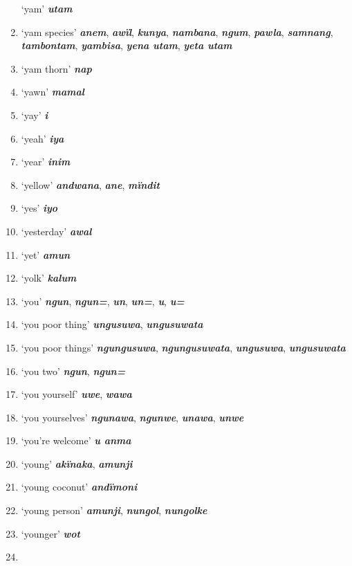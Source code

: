 \begin{enumerate}[noitemsep, label={}, align=left, widest=190, labelsep=1ex,leftmargin=*,itemindent=-10pt]
‘yam’ \textbf{\textit{utam}} \item
‘yam species’ \textbf{\textit{anem}}, \textbf{\textit{awïl}}, \textbf{\textit{kunya}}, \textbf{\textit{nambana}}, \textbf{\textit{ngum}}, \textbf{\textit{pawla}}, \textbf{\textit{samnang}}, \linebreak \textbf{\textit{tambontam}}, \textbf{\textit{yambisa}}, \textbf{\textit{yena utam}}, \textbf{\textit{yeta utam}} \item
‘yam thorn’ \textbf{\textit{nap}} \item
‘yawn’ \textbf{\textit{mamal}} \item
‘yay’ \textbf{\textit{i}} \item
‘yeah’ \textbf{\textit{iya}} \item
‘year’ \textbf{\textit{inim}} \item
‘yellow’ \textbf{\textit{andwana}}, \textbf{\textit{ane}}, \textbf{\textit{mïndit}} \item
‘yes’ \textbf{\textit{iyo}} \item
‘yesterday’ \textbf{\textit{awal}} \item
‘yet’ \textbf{\textit{amun}} \item
‘yolk’ \textbf{\textit{kalum}} \item
‘you’ \textbf{\textit{ngun}}, \textbf{\textit{ngun=}}, \textbf{\textit{un}}, \textbf{\textit{un=}}, \textbf{\textit{u}}, \textbf{\textit{u=}} \item
‘you poor thing’ \textbf{\textit{ungusuwa}}, \textbf{\textit{ungusuwata}} \item
‘you poor things’ \textbf{\textit{ngungusuwa}}, \textbf{\textit{ngungusuwata}}, \textbf{\textit{ungusuwa}}, \textbf{\textit{ungusuwata}} \item
‘you two’ \textbf{\textit{ngun}}, \textbf{\textit{ngun=}} \item
‘you yourself’ \textbf{\textit{uwe}}, \textbf{\textit{wawa}} \item
‘you yourselves’ \textbf{\textit{ngunawa}}, \textbf{\textit{ngunwe}}, \textbf{\textit{unawa}}, \textbf{\textit{unwe}} \item
‘you’re welcome’ \textbf{\textit{u anma}} \item
‘young’ \textbf{\textit{akïnaka}}, \textbf{\textit{amunji}} \item
‘young coconut’ \textbf{\textit{andïmoni}} \item
‘young person’ \textbf{\textit{amunji}}, \textbf{\textit{nungol}}, \textbf{\textit{nungolke}} \item
‘younger’ \textbf{\textit{wot}} \item

\end{enumerate}
